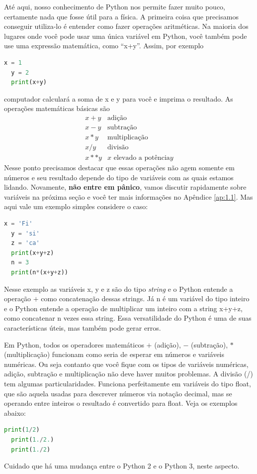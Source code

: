 Até aqui, nosso conhecimento de Python nos permite fazer muito pouco, certamente nada que fosse útil para a física. A primeira coisa que precisamos conseguir utiliza-lo é entender como fazer operações aritméticas. Na maioria dos lugares onde você pode usar uma única variável em Python, você também pode use uma expressão matemática, como ``x+y''. Assim, por exemplo 
\begin{lstlisting}[language=Python]
  x = 1
  y = 2
  print(x+y)
\end{lstlisting}
computador calculará a soma de x e y para você e imprima o resultado. As operações matemáticas básicas são 
\[ \begin{array}{cc}
    x + y & \textrm{adição} \\
    x - y & \textrm{subtração} \\
    x * y & \textrm{multiplicação} \\
    x / y & \textrm{divisão} \\
    x ** y & x\text{ elevado a potência} y
\end{array} \]
Nesse ponto precisamos destacar que essas operações não agem somente em números e seu resultado depende do tipo de variáveis com as quais estamos lidando. Novamente, {\bf não entre em pânico}, vamos discutir rapidamente sobre variáveis na próxima seção e você ter mais informações no Apêndice \ref{ap:1.1}. Mas aqui vale um exemplo simples considere o caso:
\begin{lstlisting}[language=Python]
  x = 'Fi'
  y = 'si'
  z = 'ca'
  print(x+y+z)
  n = 3
  print(n*(x+y+z))
\end{lstlisting}
Nesse exemplo as variáveis x, y e z são do tipo {\it string} e o Python entende a operação $+$ como concatenação dessas strings. Já n é um variável do tipo inteiro e o Python entende a operação de multiplicar um inteiro com a string x+y+z, como concatenar n vezes essa string. Essa versatilidade do Python é uma de suas características úteis, mas também pode gerar erros.

Em Python, todos os operadores matemáticos $+$ (adição), $-$ (subtração), $*$ (multiplicação) funcionam como seria de esperar em números e variáveis numéricas. Ou seja contanto que você fique com os tipos de variáveis numéricas, adição, subtração e
multiplicação não deve haver muitos problemas. A divisão (/) tem algumas particularidades. Funciona perfeitamente em variáveis do tipo float, que são aquela usadas para descrever números via notação decimal, mas se operando entre inteiros o resultado é convertido para float. Veja os exemplos abaixo:
\begin{lstlisting}[language=Python]
  print(1/2)
  print(1./2.)
  print(1./2)
\end{lstlisting}
Cuidado que há uma mudança entre o Python 2 e o Python 3, neste aspecto.

